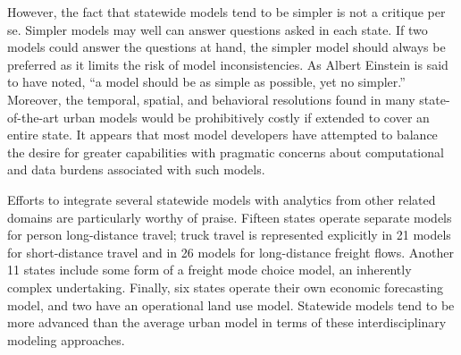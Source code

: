 However, the fact that statewide models tend to be simpler is not a critique per se. Simpler models may well can answer questions asked in each state. If two models could answer the questions at hand, the simpler model should always be preferred as it limits the risk of model inconsistencies. As Albert Einstein is said to have noted, ``a model should be as simple as possible, yet no simpler.'' Moreover, the temporal, spatial, and behavioral resolutions found in many state-of-the-art urban models would be prohibitively costly if extended to cover an entire state. It appears that most model developers have attempted to balance the desire for greater capabilities with pragmatic concerns about computational and data burdens associated with such models.

Efforts to integrate several statewide models with analytics from other related domains are particularly worthy of praise. Fifteen states operate separate models for person long-distance travel; truck travel is represented explicitly in 21 models for short-distance travel and in 26 models for long-distance freight flows. Another 11 states include some form of a freight mode choice model, an inherently complex undertaking. Finally, six states operate their own economic forecasting model, and two have an operational land use model. Statewide models tend to be more advanced than the average urban model in terms of these interdisciplinary modeling approaches.